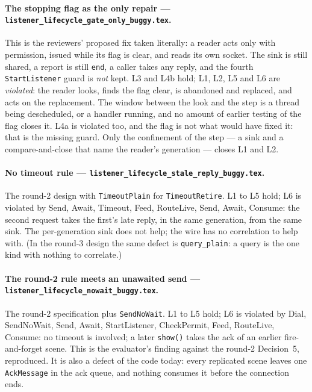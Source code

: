 \documentclass[a4paper,10pt,fleqn]{article}
\begin{document}
\paragraph{The stopping flag as the only repair ---
\texttt{listener\_lifecycle\_gate\_only\_buggy.tex}.}
This is the reviewers' proposed fix taken literally: a reader acts only with
permission, issued while its flag is clear, and reads its own socket.  The
sink is still shared, a report is still \texttt{end}, a caller takes any
reply, and the fourth \texttt{StartListener} guard is \emph{not} kept.  L3 and
L4b hold; L1, L2, L5 and L6 are \emph{violated}: the reader looks, finds the
flag clear, is abandoned and replaced, and acts on the replacement.  The window
between the look and the step is a thread being descheduled, or a handler
running, and no amount of earlier testing of the flag closes it.  L4a is
violated too, and the flag is not what would have fixed it: that is the
missing guard.  Only the confinement of the step --- a sink and a
compare-and-close that name the reader's generation --- closes L1 and L2.

\paragraph{No timeout rule ---
\texttt{listener\_lifecycle\_stale\_reply\_buggy.tex}.}
The round-2 design with \texttt{TimeoutPlain} for \texttt{TimeoutRetire}.  L1 to
L5 hold; L6 is violated by Send, Await, Timeout, Feed, RouteLive, Send,
Await, Consume: the second request takes the first's late reply, in the same
generation, from the same sink.  The per-generation sink does not help; the
wire has no correlation to help with.  (In the round-3 design the same defect
is \texttt{query\_plain}: a query is the one kind with nothing to correlate.)

\paragraph{The round-2 rule meets an unawaited send ---
\texttt{listener\_lifecycle\_nowait\_buggy.tex}.}
The round-2 specification plus \texttt{SendNoWait}.  L1 to L5 hold; L6 is
violated by Dial, SendNoWait, Send, Await, StartListener, CheckPermit, Feed,
RouteLive, Consume: no timeout is involved; a later \texttt{show()} takes the
ack of an earlier fire-and-forget scene.  This is the evaluator's finding
against the round-2 Decision~5, reproduced.  It is also a defect of the code
today: every replicated scene leaves one \texttt{AckMessage} in the ack queue,
and nothing consumes it before the connection ends.
\end{document}
